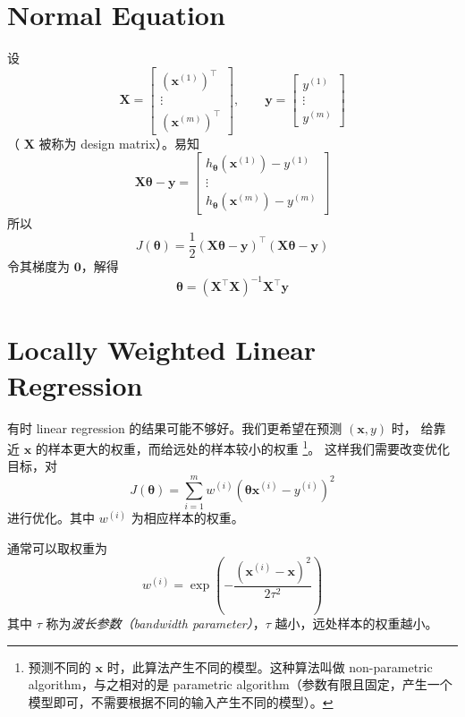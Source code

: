 	\section{Normal Equation}
		设
		\begin{equation*}
			\bm{X} = 
			\begin{bmatrix}
				(\bm{x}^{(1)})^\intercal \\
				\vdots \\
				(\bm{x}^{(m)})^\intercal
			\end{bmatrix}
			, \qquad \bm{y} = 
			\begin{bmatrix}
				y^{(1)} \\
				\vdots \\
				y^{(m)}
			\end{bmatrix}
		\end{equation*}
		（ $ \bm{X} $ 被称为 design matrix）。易知 
		\begin{equation}
			\bm{X} \bm{\theta} - \bm{y} = 
			\begin{bmatrix}
				h_{\bm{\theta}} (\bm{x}^{(1)}) - y^{(1)} \\
				\vdots \\
				h_{\bm{\theta}} (\bm{x}^{(m)}) - y^{(m)} 
			\end{bmatrix}
		\end{equation}
		所以 
		\begin{equation}
			J(\bm{\theta}) = \frac{1}{2} \left( \bm{X} \bm{\theta} - \bm{y} \right)^\intercal \left( \bm{X}\bm{\theta} - \bm{y} \right)
		\end{equation}
		令其梯度为 $ \bm{0} $，解得 
		\begin{equation}
			\bm{\theta} = \left( \bm{X}^\intercal \bm{X} \right) ^{-1} \bm{X}^\intercal \bm{y}
		\end{equation}
		
	\section{Locally Weighted Linear Regression}
		有时 linear regression 的结果可能不够好。我们更希望在预测 $ (\bm{x}, y) $ 时，
		给靠近 $ \bm{x} $ 的样本更大的权重，而给远处的样本较小的权重
		\footnote{预测不同的 $ \bm{x} $ 时，此算法产生不同的模型。这种算法叫做 non-parametric algorithm，与之相对的是 parametric algorithm（参数有限且固定，产生一个模型即可，不需要根据不同的输入产生不同的模型）。}。
		这样我们需要改变优化目标，对 
		\begin{equation}
			J(\bm{\theta}) = \sum_{i=1}^{m} w^{(i)} (\bm{\theta}\bm{x}^{(i)} - y^{(i)})^2
		\end{equation}
		进行优化。其中 $ w^{(i)} $ 为相应样本的权重。
		
		通常可以取权重为
		\begin{equation}
			w^{(i)} = \exp \left( - \frac{ (\bm{x}^{(i)} - \bm{x})^2 }{2\tau ^2} \right)
		\end{equation}
		其中 $ \tau $ 称为\emph{波长参数（bandwidth parameter）}，$ \tau $ 越小，远处样本的权重越小。
